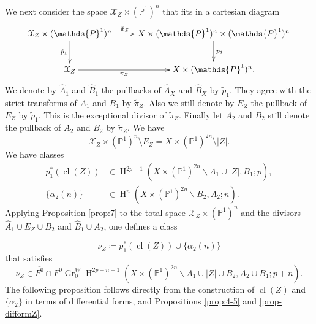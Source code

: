 \documentclass[11pt,a4paper]{amsart}
\renewcommand{\P}{\mathds{P}}
\newcommand{\caX}{\mathcal{X}}
\DeclareMathOperator {\Gr} {Gr}
\DeclareMathOperator {\cl}{cl}
\DeclareMathOperator{\rH}{H}
\numberwithin{equation}{section}
\theoremstyle{plain}
\theoremstyle{definition}
\begin{document}
We next consider the space $\caX_{Z}\times (\P^{1})^{n}$ that fits in
a cartesian diagram
\begin{displaymath}
  \xymatrix{
    \caX_{Z}\times (\P^{1})^{n}\ar[r]^-{\tilde \pi _{Z}}\ar[d]_{\tilde
      p_{1}} &
    X\times (\P^{1})^{n}\times (\P^{1})^{n }\ar[d]^{p_{1}}\\
    \caX_{Z}\ar[r]_-{\pi _{Z}}& X\times (\P^{1})^{n}.
  }
\end{displaymath}
We denote by $\widehat A_{1}$ and $\widehat B_{1}$ the pullbacks of
$\widehat A_{X}$ and $\widehat B_{X}$ by $\tilde p_{1}$. They agree
with the strict transforms of $A_{1}$ and $B_{1}$ by $\widetilde \pi
_{Z}$. Also we still denote by $E_{Z}$ the pullback of $E_{Z}$ by
$\tilde p_{1}$. This
is the exceptional divisor of $\tilde \pi _{Z}$. Finally let $A_{2}$
and $B_{2}$ still denote the pullback of $A_{2}$ and $B_{2}$ by
$\tilde \pi _{Z}$. We have
\begin{displaymath}
  \caX_{Z}\times (\P^{1})^{n}\setminus E_{Z}=X\times
  (\P^{1})^{2n}\setminus  |Z|.
\end{displaymath}
We have classes
\begin{align*}
  p_{1}^{\ast}(\cl(Z))
  &\in \rH^{2p-1}(X\times
    (\P^{1})^{2n}\smallsetminus
    A_{1}\cup |Z|,B_{1}; p),\\
  \{\alpha  _{2}(n)\}
  &\in
    \rH^{n}(X\times
  (\P^{1})^{2n}\smallsetminus
  B_{2},A_{2}; n).
\end{align*}
Applying Proposition \ref{prop:7} to the total space $\caX_{Z}\times
(\P^{1})^{n}$ and the divisors $\widehat A_{1}\cup E_{Z}\cup B_{2}$
and $\widehat B_{1}\cup A_{2}$, one defines a class

\begin{displaymath}
  \nu_{Z}\coloneqq p_{1}^{\ast}(\cl(Z))\cup \{\alpha  _{2}(n)\}
\end{displaymath}
 that satisfies 
\begin{displaymath}
  \nu_{Z}\in
  \overline {F^{0}}\cap F^{0}\Gr^{W}_{0}\rH^{2p+n-1}(X\times
  (\P^{1})^{2n}\smallsetminus
  A_{1}\cup |Z|\cup 
  B_{2},A_{2}\cup B_{1}; p+n).
\end{displaymath}
The following proposition follows directly from the construction of
$\cl(Z)$ and $\{\alpha_{2}\}$ in terms of differential forms, and
Propositions \ref{prop:4-5} and \ref{prop-difformZ}.
\end{document}
